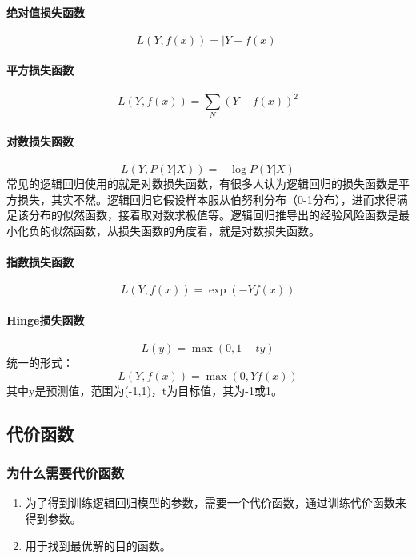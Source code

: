 \documentclass[UTF8]{ctexart}
\begin{document}
\paragraph{绝对值损失函数}
$$L(Y, f(x)) = |Y-f(x)|​$$
\paragraph{平方损失函数}
$$L(Y, f(x)) = \sum_N{(Y-f(x))}^2$$
\paragraph{对数损失函数}
$$L(Y, P(Y|X)) = -\log{P(Y|X)}$$
常见的逻辑回归使用的就是对数损失函数，有很多人认为逻辑回归的损失函数是平方损失，其实不然。逻辑回归它假设样本服从伯努利分布（0-1分布），进而求得满足该分布的似然函数，接着取对数求极值等。逻辑回归推导出的经验风险函数是最小化负的似然函数，从损失函数的角度看，就是对数损失函数。
\paragraph{指数损失函数}
$$L(Y, f(x)) = \exp(-Yf(x))$$
\paragraph{Hinge损失函数}
$$L(y) = \max{(0, 1-ty)}$$
统一的形式：
$$L(Y, f(x)) = \max{(0, Yf(x))}$$
其中y是预测值，范围为(-1,1)，t为目标值，其为-1或1。





\subsection{代价函数}
\subsubsection{为什么需要代价函数}
\begin{enumerate}
	\item 为了得到训练逻辑回归模型的参数，需要一个代价函数，通过训练代价函数来得到参数。
	\item 用于找到最优解的目的函数。
\end{enumerate}
\end{document}
